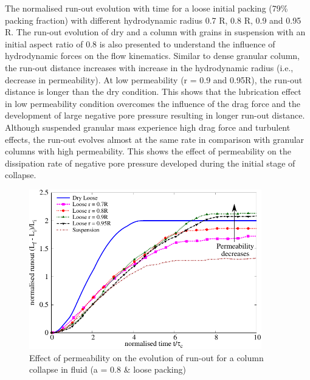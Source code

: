 The normalised run-out evolution with time for a loose initial packing (79\% 
packing fraction) with different hydrodynamic radius 0.7 R, 0.8 R, 0.9 and 0.95 
R. The run-out evolution of dry and a column with grains in suspension with an 
initial aspect ratio of 0.8 is also presented to understand the influence of 
hydrodynamic forces on the flow kinematics. Similar to dense granular column, 
the run-out distance increases with increase in the hydrodynamic radius (i.e., 
decrease in permeability). At low permeability (r = 0.9 and 0.95R), the run-out 
distance is longer than the dry condition. This shows that the lubrication 
effect in low permeability condition overcomes the influence of 
the drag force and the development of large negative pore pressure resulting in 
longer run-out distance. Although suspended granular mass experience high drag 
force and turbulent effects, the run-out evolves almost at the same rate in 
comparison with granular columns with high permeability. This shows the effect 
of permeability on the dissipation rate of negative pore pressure developed 
during the initial stage of collapse.

\begin{figure}
\centering
\includegraphics[width=0.9\textwidth]{Runout_a08_loose}
\caption{Effect of permeability on the evolution of run-out for a column 
collapse in fluid (a = 0.8 \& loose packing)}
\label{fig:Runout_a08_loose}
\end{figure}

